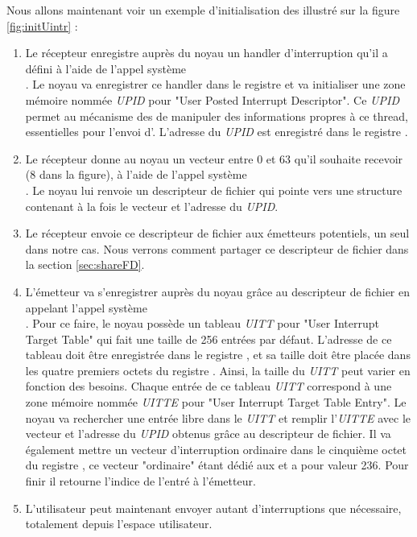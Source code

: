 Nous allons maintenant voir un exemple d'initialisation des \uintr{} illustré sur la figure \ref{fig:initUintr} :

\begin{enumerate}[label=\protect\circled{\arabic*}]
  \item Le récepteur enregistre auprès du noyau un handler d'interruption qu'il a défini à l'aide de l'appel système\\
  .
  Le noyau va enregistrer ce handler dans le registre  et va initialiser une zone mémoire nommée \emph{UPID} pour "User Posted Interrupt Descriptor".
  Ce \emph{UPID} permet au mécanisme des \uintr{} de manipuler des informations propres à ce thread, essentielles pour l'envoi d'\uintr{}.
  L'adresse du \emph{UPID} est enregistré dans le registre .
  \item Le récepteur donne au noyau un vecteur \uintr{} entre 0 et 63 qu'il souhaite recevoir (8 dans la figure),
  à l'aide de l'appel système\\
  .
  Le noyau lui renvoie un descripteur de fichier qui pointe vers une structure contenant à la fois le vecteur et l'adresse du \emph{UPID}.
  \item Le récepteur envoie ce descripteur de fichier aux émetteurs potentiels, un seul dans notre cas.
  Nous verrons comment partager ce descripteur de fichier dans la section \ref{sec:shareFD}.
  \item L'émetteur va s'enregistrer auprès du noyau grâce au descripteur de fichier en appelant l'appel système\\
  .
  Pour ce faire, le noyau possède un tableau \emph{UITT} pour "User Interrupt Target Table" qui fait une taille de 256 entrées par défaut.
  L'adresse de ce tableau doit être enregistrée dans le registre ,
  et sa taille doit être placée dans les quatre premiers octets du registre .
  Ainsi, la taille du \emph{UITT} peut varier en fonction des besoins.
  Chaque entrée de ce tableau \emph{UITT} correspond à une zone mémoire nommée \emph{UITTE} pour "User Interrupt Target Table Entry".
  Le noyau va rechercher une entrée libre dans le \emph{UITT} et remplir l'\emph{UITTE} avec le vecteur \uintr{} et
  l'adresse du \emph{UPID} obtenus grâce au descripteur de fichier.
  Il va également mettre un vecteur d'interruption ordinaire dans le cinquième octet du registre ,
  ce vecteur "ordinaire" étant dédié aux \uintr{} et a pour valeur 236.
  Pour finir il retourne l'indice de l'entré à l'émetteur.
  \item L'utilisateur peut maintenant envoyer autant d'interruptions que nécessaire, totalement depuis l'espace utilisateur.
\end{enumerate}

